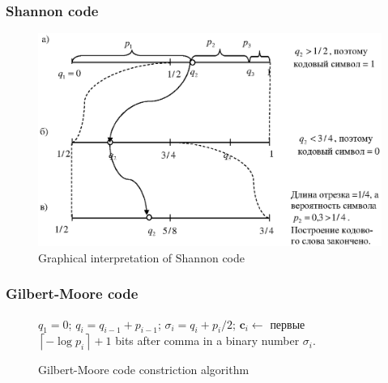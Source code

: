 \documentclass[14pt]{beamer}
\renewcommand{\vec}[1]{\ensuremath{\boldsymbol{#1}}}
\begin{document}
\begin{frame}
\frametitle{Shannon code}
\begin{itemize}    

\begin{figure}[ht]
\begin{minipage}{1.0\linewidth}
\includegraphics[width=1.0\textwidth]{fig2_7.eps}
\caption{Graphical interpretation of Shannon code }
\label{Shan_graph}
\end{minipage}
\end{figure}

\end{itemize}
\end{frame}


\begin{frame}
\frametitle{Gilbert-Moore code}
\begin{itemize}    

    \begin{center}
    \begin{figure}
    \scalebox{0.75} {
    \begin{algorithm}[H]
    \dontprintsemicolon
      \BlankLine
      $q_{1}=0$;
      {
      $q_i=q_{i-1}+p_{i-1}$;
      $\sigma_i=q_i+p_i/2$;
      }
      \BlankLine
      {
      $\vec c_i\leftarrow $ первые
      $\left\lceil { - \log p_i } \right\rceil +1$ bits after comma in a binary number  $\sigma_i$.
      }
    \end{algorithm}
    }
    \caption{Gilbert-Moore code constriction algorithm}
    \label{alg_gm}
    \end{figure}
    \end{center}

\end{itemize}
\end{frame}
\end{document}
